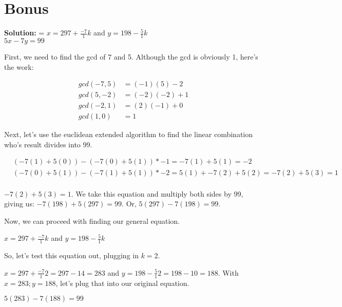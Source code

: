 \documentclass{article}
\begin{document}
\section{Bonus}

\textbf{Solution: } = $x = 297 + \frac{-7}{1}k$ and $y = 198 - \frac{5}{1}k$ \\

$5x - 7y = 99$

First, we need to find the gcd of 7 and 5. Although the gcd is obviously 1, here's the work:

\begin{align*}
   gcd(-7, 5) &= (-1)(5) - 2\\
   gcd(5, -2) &= (-2)(-2) + 1\\
   gcd(-2, 1) &= (2)(-1) + 0\\
   gcd(1, 0) &= 1
\end{align*}

Next, let's use the euclidean extended algorithm to find the linear combination who's result divides into 99.

\begin{align*}
   &(-7(1) + 5(0)) - (-7(0) + 5(1)) * -1 = -7(1) + 5(1) = -2\\
   &(-7(0) + 5(1)) - (-7(1) + 5(1)) * -2 = 5(1) + -7(2) + 5(2) = -7(2) + 5(3) = 1 \\
\end{align*}

$-7(2) + 5(3) =1 $. We take this equation and multiply both sides by 99, giving us: $-7(198) + 5(297) = 99$. Or, $5(297) - 7(198) = 99$.

Now, we can proceed with finding our general equation.

$x = 297 + \frac{-7}{1}k$ and $y = 198 - \frac{5}{1}k$

So, let's test this equation out, plugging in $k=2$.

$x = 297 + \frac{-7}{1}2 = 297 - 14 = 283$ and $y = 198 - \frac{5}{1}2 = 198 - 10 = 188$. With $x=283; y=188$, let's plug that into our original equation.

$5(283) - 7(188) = 99$
\end{document}
